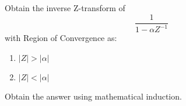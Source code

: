 \documentclass{article}
\begin{document}
Obtain the inverse Z-transform of 
\[
\frac{1}{1 - \alpha Z^{-1}}
\]
with Region of Convergence as:

\begin{enumerate}
    \item $|Z| > |\alpha|$
    \item $|Z| < |\alpha|$
\end{enumerate}

Obtain the answer using mathematical induction.
\end{document}
